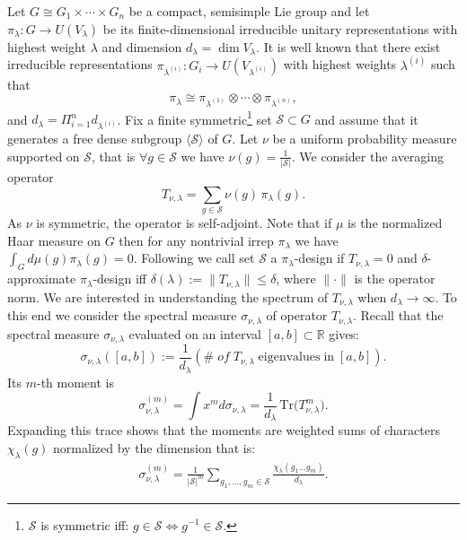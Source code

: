 \documentclass[11pt, a4paper]{article}
\theoremstyle{definition}
\theoremstyle{remark}
\begin{document}
Let $G \cong G_1 \times \cdots \times G_n$ be a compact, semisimple Lie group and let 
$\pi_\lambda: G \to U(V_\lambda)$ be its finite-dimensional irreducible unitary representations with highest weight $\lambda$ and 
dimension $d_\lambda=\dim V_\lambda$. It is well known that 
there exist irreducible representations $\pi_{\lambda^{(i)}}:G_i\rightarrow U(V_{\lambda^{(i)}})$ with highest weights $\lambda^{(i)}$ such that
\[
\pi_\lambda \cong \pi_{\lambda^{(1)}} \otimes \cdots \otimes \pi_{\lambda^{(n)}},
\] 
and $d_\lambda=\Pi_{i=1}^n d_{\lambda^{(i)}}$. Fix a finite symmetric\footnote{$\mathcal{S}$ is symmetric iff: $g\in \mathcal{S}\iff g^{-1}\in \mathcal{S}$.} set $\mathcal{S}\subset G$ and assume that it  generates a free dense subgroup $\langle \mathcal{S}\rangle$ of $G$. 
Let $\nu$ be a uniform probability measure supported on $\mathcal{S}$, that is $\forall g\in \mathcal{S}$ we have $\nu(g)=\frac{1}{|\mathcal{S}|}$. 
We consider the averaging operator
\begin{equation}
T_{\nu,\lambda} = \sum_{g\in\mathcal{S}} \nu(g)\, \pi_\lambda(g).
\end{equation}
As $\nu$ is symmetric, the operator is self-adjoint. Note that if $\mu$ is the normalized Haar measure on $G$ then for any nontrivial irrep $\pi_\lambda$ we have $\int_{G}d\mu(g)\pi_\lambda(g)=0$. Following \cite{BANNAI2022108457} we call set $\mathcal{S}$ a $\pi_\lambda$-design if $T_{\nu,\lambda}=0$ and $\delta$-approximate $\pi_\lambda$-design iff $\delta(\lambda):=\|T_{\nu,\lambda}\|\leq\delta$, where $\|\cdot\|$ is the operator norm. We are interested in understanding the spectrum of $T_{\nu,\lambda}$ when $d_\lambda\rightarrow \infty$. To this end we consider the spectral measure $\sigma_{\nu,\lambda}$ of operator $T_{\nu,\lambda}$. Recall that the spectral measure $\sigma_{\nu,\lambda}$ evaluated on an interval $[a,b]\subset\mathbb{R}$ gives:
\begin{equation*}
    \sigma_{\nu,\lambda}([a,b]) := \frac{1}{d_\lambda} (\# \; of \; T_{\nu,\lambda} \; \mathrm{eigenvalues} \;  \mathrm{in} \; [a,b]).
\end{equation*} Its $m$-th moment is
\begin{equation}
\sigma_{\nu,\lambda}^{(m)} =\int x^m d\sigma_{\nu,\lambda}= \frac{1}{d_\lambda}\,\mathrm{Tr}\!\big(T_{\nu,\lambda}^m\big).
\end{equation}
Expanding this trace shows that the moments are weighted sums of characters 
$\chi_\lambda(g)$ normalized by the dimension that is:
\begin{gather}\label{moment}
\sigma_{\nu,\lambda}^{(m)}=\frac{1}{|\mathcal{S}|^m}\sum_{g_1,\ldots , g_m \in \mathcal{S} }\frac{\chi_\lambda\left(g_1\ldots g_m\right)}{d_\lambda}.
\end{gather}
\end{document}
